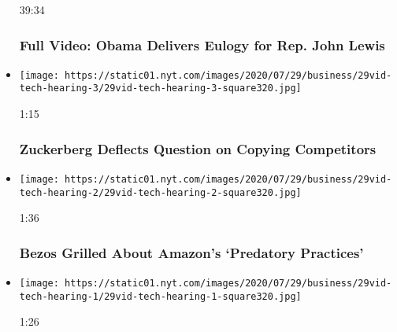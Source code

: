 \begin{itemize}
  39:34

  \hypertarget{full-video-obama-delivers-eulogy-for-rep-john-lewis}{%
  \subsubsection{Full Video: Obama Delivers Eulogy for Rep. John
  Lewis}\label{full-video-obama-delivers-eulogy-for-rep-john-lewis}}
\item
  \href{https://www.nytimes.com/video/us/politics/100000007263272/zuckerberg-jayapal-facebook.html?action=click\&module=video-series-bar\&region=header\&pgtype=Article\&playlistId=video/u-s}{}

  \texttt{[image: https://static01.nyt.com/images/2020/07/29/business/29vid-tech-hearing-3/29vid-tech-hearing-3-square320.jpg]}

  1:15

  \hypertarget{zuckerberg-deflects-question-on-copying-competitors}{%
  \subsubsection{Zuckerberg Deflects Question on Copying
  Competitors}\label{zuckerberg-deflects-question-on-copying-competitors}}
\item
  \href{https://www.nytimes.com/video/us/100000007263183/bezos-amazon-predatory-practices.html?action=click\&module=video-series-bar\&region=header\&pgtype=Article\&playlistId=video/u-s}{}

  \texttt{[image: https://static01.nyt.com/images/2020/07/29/business/29vid-tech-hearing-2/29vid-tech-hearing-2-square320.jpg]}

  1:36

  \hypertarget{bezos-grilled-about-amazons-predatory-practices}{%
  \subsubsection{Bezos Grilled About Amazon's `Predatory
  Practices'}\label{bezos-grilled-about-amazons-predatory-practices}}
\item
  \href{https://www.nytimes.com/video/us/politics/100000007263148/google-data-privacy.html?action=click\&module=video-series-bar\&region=header\&pgtype=Article\&playlistId=video/u-s}{}

  \texttt{[image: https://static01.nyt.com/images/2020/07/29/business/29vid-tech-hearing-1/29vid-tech-hearing-1-square320.jpg]}

  1:26


\end{itemize}
